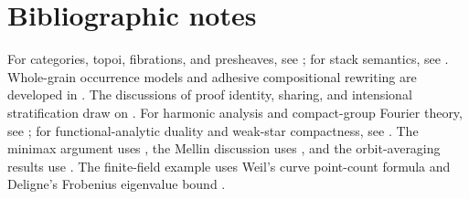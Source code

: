 \documentclass[12pt,a4paper,twoside]{extarticle}
\theoremstyle{compactplain}
\theoremstyle{compactdef}
\begin{document}
\section{Bibliographic notes}\label{sec:bibliographic-notes}
For categories, topoi, fibrations, and presheaves, see \cite{maclane,maclane-moerdijk,streicher}; for stack semantics, see \cite{coquand-mannaa-ruch}.  Whole-grain occurrence models and adhesive compositional rewriting are developed in \cite{kock-petri,lack-sobocinski,behr-harmer-krivine,zanasi-free-hypergraph,bonchi-rewriting-frobenius}.  The discussions of proof identity, sharing, and intensional stratification draw on \cite{girard,strassburger,hasegawa,pfenning,hu-pientka}.  For harmonic analysis and compact-group Fourier theory, see \cite{rudin,katznelson}; for functional-analytic duality and weak-star compactness, see \cite{conway,folland}.  The minimax argument uses \cite{sion}, the Mellin discussion uses \cite{zagier}, and the orbit-averaging results use \cite{bailleul}.  The finite-field example uses Weil's curve point-count formula and Deligne's Frobenius eigenvalue bound \cite{weil,deligne}.

\begingroup
\small
{}
{}


\endgroup
\end{document}
